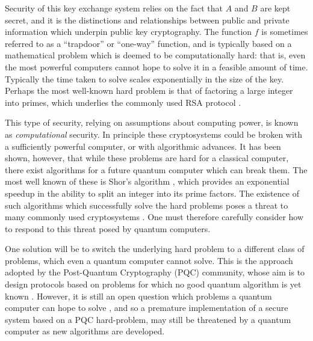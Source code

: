Security of this key exchange system relies on the fact that $A$ and $B$ are kept secret, and it is the distinctions and relationships between public and private information which underpin public key cryptography. The function $f$ is sometimes referred to as a ``trapdoor'' or ``one-way'' function, and is typically based on a mathematical problem which is deemed to be computationally hard: that is, even the most powerful computers cannot hope to solve it in a feasible amount of time. Typically the time taken to solve scales exponentially in the size of the key. Perhaps the most well-known hard problem is that of factoring a large integer into primes, which underlies the commonly used RSA protocol \cite{Rivest1978, Schneier1996}.


This type of security, relying on assumptions about computing power, is known as \emph{computational} security. In principle these cryptosystems could be broken with a sufficiently powerful computer, or with algorithmic advances. It has been shown, however, that while these problems are hard for a classical computer, there exist algorithms for a future quantum computer which can break them. The most well known of these is Shor's algorithm \cite{Shor1997},  which provides an exponential speedup in the ability to split an integer into its prime factors. %
The existence of such algorithms which successfully solve the hard problems poses a threat to many commonly used cryptosystems %
\cite{Rivest1978, Schneier1996, Amiri2015, Nielsen2010, Shor1997}. One must therefore carefully consider how to respond to this threat posed by quantum computers. 

One solution will be to switch the underlying hard problem to a different class of problems, which even a quantum computer cannot solve. This is the approach adopted by the Post-Quantum Cryptography (PQC) community, whose aim is to design protocols based on problems for which no good quantum algorithm is yet known \cite{Bernstein2017, Chen2016, Gagliardoni2017a, Bernstein2009, Alagic2019, Chrome2016}. However, it is still an open question which problems a quantum computer can hope to solve%
, and so a premature implementation of a secure system based on a PQC hard-problem, may still be threatened by a quantum computer as new algorithms are developed. 

